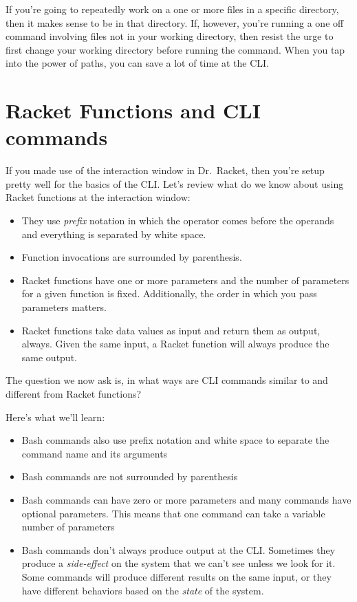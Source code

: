\documentclass[nobib]{tufte-handout}
\begin{document}
If you're going to repeatedly work on a one or more files in a specific directory, then it makes sense to be in that directory.  If, however, you're running a one off command involving files not in your working directory, then resist the urge to first change your working directory before running the command.  When you tap into the power of paths, you can save a lot of time at the CLI\@.

\section{Racket Functions and CLI commands}

If you made use of the interaction window in Dr.\ Racket, then you're setup pretty well for the basics of the CLI\@. Let's review what do we know about using Racket functions at the interaction window:
\begin{itemize}
\item They use \textit{prefix} notation in which the operator comes before the operands and everything is separated by white space.
\item Function invocations are surrounded by parenthesis.
\item Racket functions have one or more parameters and the number of parameters for a given function is fixed.  Additionally, the order in which you pass parameters matters.
\item Racket functions take data values as input and return them as output, always. Given the same input, a Racket function will always produce the same output.
\end{itemize}
The question we now ask is, in what ways are CLI commands similar to and different from Racket functions?

Here's what we'll learn:
\begin{itemize}
\item Bash commands also use prefix notation and white space to separate the command name and its arguments
\item Bash commands are not surrounded by parenthesis
\item Bash commands can have zero or more parameters and many commands have optional parameters. This means that one command can take a variable number of parameters
\item Bash commands don't always produce output at the CLI\@. Sometimes they produce a \textit{side-effect} on the system that we can't see unless we look for it.  Some commands will produce different results on the same input, or they have different behaviors based on the \textit{state} of the system.
\end{itemize}
\end{document}
